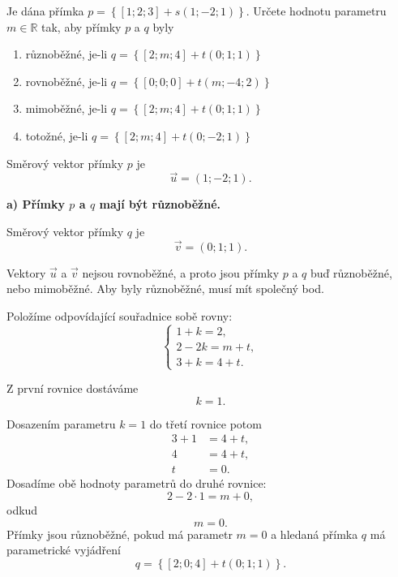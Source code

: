 \begin{example}
    \label{exa:Relative_position_lines_parameter}

    Je dána přímka $p=\left\{\left[1;2;3\right] + s\left(1;-2;1\right)\right\}$.
    Určete hodnotu parametru $m\in\mathbb{R}$ tak, aby přímky $p$ a $q$
    byly

    \begin{enumerate}[label=\alph*)]
        \item různoběžné, je-li $q=\left\{\left[2;m;4\right] + t\left(0;1;1\right)\right\}$
        \item rovnoběžné, je-li $q=\left\{\left[0;0;0\right] + t\left(m;-4;2\right)\right\}$
        \item mimoběžné, je-li $q=\left\{\left[2;m;4\right] + t\left(0;1;1\right)\right\}$
        \item totožné, je-li $q=\left\{\left[2;m;4\right] + t\left(0;-2;1\right)\right\}$
    \end{enumerate}

    Směrový vektor přímky $p$ je
    \[
        \vec{u}=(1;-2;1).
    \]

    \textbf{a) Přímky $p$ a $q$ mají být různoběžné.}

    Směrový vektor přímky $q$ je
    \[
        \vec{v}=(0;1;1).
    \]

    Vektory $\vec{u}$ a $\vec{v}$ nejsou rovnoběžné, a proto jsou
    přímky $p$ a $q$ buď různoběžné, nebo mimoběžné. Aby byly
    různoběžné, musí mít společný bod.

    Položíme odpovídající souřadnice sobě rovny:
    \[
        \begin{cases}
            1+k=2,\\
            2-2k=m+t,\\
            3+k=4+t.
        \end{cases}
    \]

    Z první rovnice dostáváme
    \[
        k=1.
    \]

    Dosazením parametru $k=1$ do třetí rovnice potom
    \begin{align*}
        3+1&=4+t,\\
        4&=4+t,\\
        t&=0.
    \end{align*}
    Dosadíme obě hodnoty parametrů do druhé rovnice:
    \[
        2-2\cdot1=m+0,
    \]
    odkud
    \[
        m=0.
    \]
    Přímky jsou různoběžné, pokud má parametr $m=0$ a hledaná přímka $q$ má parametrické vyjádření
    \[
        q=\left\{\left[2;0;4\right] + t\left(0;1;1\right)\right\}.
    \]



\end{example}
